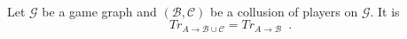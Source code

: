 \begin{theorem} \ \\
   \label{sybil}
   Let $\mathcal{G}$ be a game graph and $\left(\mathcal{B}, \mathcal{C}\right)$ be a collusion of players on
   $\mathcal{G}$. It is
   \begin{equation*}
      Tr_{A \rightarrow \mathcal{B} \cup \mathcal{C}} = Tr_{A \rightarrow \mathcal{B}} \enspace.
   \end{equation*}
\end{theorem}
